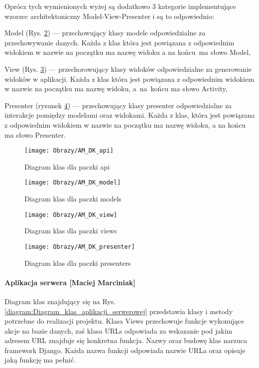 \documentclass[twoside,10pt]{article}
\begin{document}
Oprócz tych wymienionych wyżej są dodatkowo 3 kategorie implementujące wzorzec architektoniczny Model-View-Presenter i są to odpowiednio:
\begin{itemize*}
\item Model (Rys. \ref{Diagram klas dla paczki models}) 
--- przechowujący klasy modele odpowiedzialne za przechowywanie danych. Każda z klas która jest powiązana z odpowiednim widokiem   w nazwie na początku ma nazwę widoku a na końcu~ma słowo Model,   
\item View 
(Rys. \ref{Diagram klas dla paczki views}) 
--- przechorowujący klasy widoków odpowiedzialne za generowanie widoków w aplikacji. Każda z klas która jest powiązana z odpowiednim widokiem   w nazwie na początku ma nazwę widoku, a~na~końcu ma słowo Activity, 
\item Presenter
(rysunek \ref{Diagram klas dla paczki presenters}) 
--- przechowujący klasy presenter odpowiedzialne za interakcje pomiędzy modelami oraz widokami. Każda z klas, która jest powiązana z odpowiednim widokiem w nazwie na początku ma nazwę widoku, a na końcu ma słowo Presenter\cite{And}.
\end{itemize*}
\newpage
\begin{figure}[ht!]
\centering
\texttt{[image: Obrazy/AM\_DK\_api]}
\caption{Diagram klas dla paczki api}
\label{Diagram klas dla paczki api}
\end{figure}
\newpage

\newpage
\begin{figure}[ht!]
\centering
\texttt{[image: Obrazy/AM\_DK\_model]}
\caption{Diagram klas dla paczki models}
\label{Diagram klas dla paczki models}
\end{figure}

\newpage
\begin{figure}[ht!]
\centering
\texttt{[image: Obrazy/AM\_DK\_view]}
\caption{Diagram klas dla paczki views}
\label{Diagram klas dla paczki views}
\end{figure}
\newpage

\begin{figure}[ht!]
\centering
\texttt{[image: Obrazy/AM\_DK\_presenter]}
\caption{Diagram klas dla paczki presenters}
\label{Diagram klas dla paczki presenters}
\end{figure}
\newpage

\paragraph*{Aplikacja serwera [Maciej Marciniak]}
Diagram klas znajdujący się na Rys. \ref{diagram:Diagram_klas_aplikacji_serwerowej} przedstawia klasy i metody potrzebne do realizacji projektu. Klasa Views przechowuje funkcje wykonujące akcje na bazie danych, zaś klasa URLs odpowiada za wskazanie pod jakim adresem URL znajduje się konkretna funkcja. Nazwy oraz budowę klas narzuca framework Django. Każda nazwa funkcji odpowiada nazwie URLa oraz opisuje jaką funkcję ma pełnić.
\end{document}
